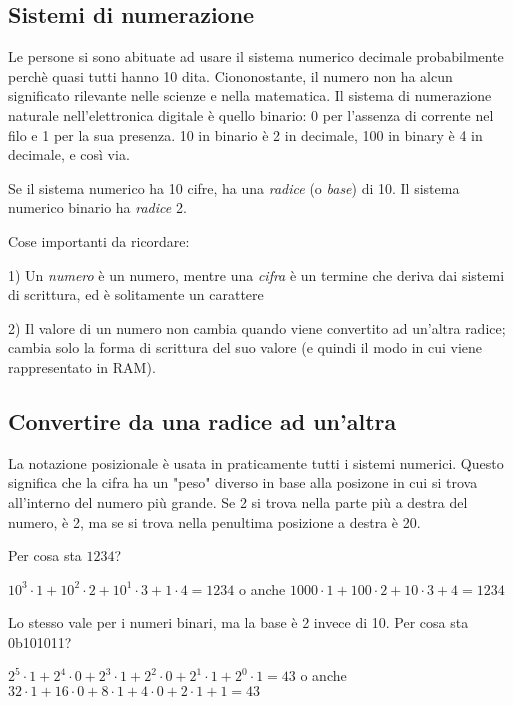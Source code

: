\subsection{Sistemi di numerazione}

Le persone si sono abituate ad usare il sistema numerico decimale probabilmente perchè quasi tutti hanno 10 dita.
Ciononostante, il numero  non ha alcun significato rilevante nelle scienze e nella matematica.
Il sistema di numerazione naturale nell'elettronica digitale è quello binario: 0 per l'assenza di corrente nel filo e 1 per la sua presenza.
10 in binario è 2 in decimale, 100 in binary è 4 in decimale, e così via.

Se il sistema numerico ha 10 cifre, ha una \emph{radice} (o \emph{base}) di 10.
Il sistema numerico binario ha \emph{radice} 2.

Cose importanti da ricordare:

1) Un \emph{numero} è un numero, mentre una \emph{cifra} è un termine che deriva dai sistemi di scrittura,
ed è solitamente un carattere

2) Il valore di un numero non cambia quando viene convertito ad un'altra radice;
cambia solo la forma di scrittura del suo valore (e quindi il modo in cui viene rappresentato in \ac{RAM}).

\subsection{Convertire da una radice ad un'altra}

La notazione posizionale è usata in praticamente tutti i sistemi numerici.
Questo significa che la cifra ha un "peso" diverso in base alla posizone in cui si trova all'interno del numero più grande.
Se 2 si trova nella parte più a destra del numero, è 2, ma se si trova nella penultima posizione a destra è 20.

Per cosa sta $1234$?

$10^3 \cdot 1 + 10^2 \cdot 2 + 10^1 \cdot 3 + 1 \cdot 4 = 1234$ o anche
$1000 \cdot 1 + 100 \cdot 2 + 10 \cdot 3 + 4 = 1234$

Lo stesso vale per i numeri binari, ma la base è 2 invece di 10.
Per cosa sta 0b101011?

$2^5 \cdot 1 + 2^4 \cdot 0 + 2^3 \cdot 1 + 2^2 \cdot 0 + 2^1 \cdot 1 + 2^0 \cdot 1 = 43$ o anche
$32 \cdot 1 + 16 \cdot 0 + 8 \cdot 1 + 4 \cdot 0 + 2 \cdot 1 + 1 = 43$


